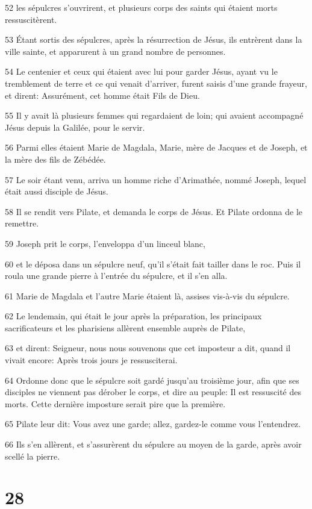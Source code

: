 \par 52 les sépulcres s'ouvrirent, et plusieurs corps des saints qui étaient morts ressuscitèrent.
\par 53 Étant sortis des sépulcres, après la résurrection de Jésus, ils entrèrent dans la ville sainte, et apparurent à un grand nombre de personnes.
\par 54 Le centenier et ceux qui étaient avec lui pour garder Jésus, ayant vu le tremblement de terre et ce qui venait d'arriver, furent saisis d'une grande frayeur, et dirent: Assurément, cet homme était Fils de Dieu.
\par 55 Il y avait là plusieurs femmes qui regardaient de loin; qui avaient accompagné Jésus depuis la Galilée, pour le servir.
\par 56 Parmi elles étaient Marie de Magdala, Marie, mère de Jacques et de Joseph, et la mère des fils de Zébédée.
\par 57 Le soir étant venu, arriva un homme riche d'Arimathée, nommé Joseph, lequel était aussi disciple de Jésus.
\par 58 Il se rendit vers Pilate, et demanda le corps de Jésus. Et Pilate ordonna de le remettre.
\par 59 Joseph prit le corps, l'enveloppa d'un linceul blanc,
\par 60 et le déposa dans un sépulcre neuf, qu'il s'était fait tailler dans le roc. Puis il roula une grande pierre à l'entrée du sépulcre, et il s'en alla.
\par 61 Marie de Magdala et l'autre Marie étaient là, assises vis-à-vis du sépulcre.
\par 62 Le lendemain, qui était le jour après la préparation, les principaux sacrificateurs et les pharisiens allèrent ensemble auprès de Pilate,
\par 63 et dirent: Seigneur, nous nous souvenons que cet imposteur a dit, quand il vivait encore: Après trois jours je ressusciterai.
\par 64 Ordonne donc que le sépulcre soit gardé jusqu'au troisième jour, afin que ses disciples ne viennent pas dérober le corps, et dire au peuple: Il est ressuscité des morts. Cette dernière imposture serait pire que la première.
\par 65 Pilate leur dit: Vous avez une garde; allez, gardez-le comme vous l'entendrez.
\par 66 Ils s'en allèrent, et s'assurèrent du sépulcre au moyen de la garde, après avoir scellé la pierre.

\chapter{28}

